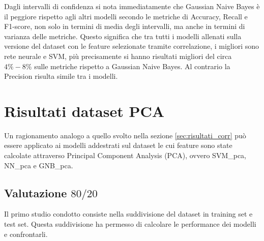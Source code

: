 Dagli intervalli di confidenza si nota immediatamente che Gaussian Naive Bayes è
il peggiore rispetto agli altri modelli secondo le metriche di Accuracy, Recall
e F1-score, non solo in termini di media degli intervalli, ma anche in termini
di varianza delle metriche. Questo significa che tra tutti i modelli allenati
sulla versione del dataset con le feature selezionate tramite correlazione, i
migliori sono rete neurale e SVM, più precisamente si hanno risultati migliori
del circa $4\%-8\%$ sulle metriche rispetto a Gaussian Naive Bayes. Al contrario
la Precision risulta simile tra i modelli.
\newpage
\section{Risultati dataset PCA} \label{sec:risultati_pca}
Un ragionamento analogo a quello svolto nella sezione \ref{sec:risultati_corr}
può essere applicato ai modelli addestrati sul dataset le cui feature sono state
calcolate attraverso Principal Component Analysis (PCA), ovvero SVM\_pca, NN\_pca e
GNB\_pca.
\subsection{Valutazione $80/20$}
Il primo studio condotto consiste nella suddivisione del dataset in training
set e test set. Questa suddivisione ha permesso di calcolare le performance dei
modelli e confrontarli.

